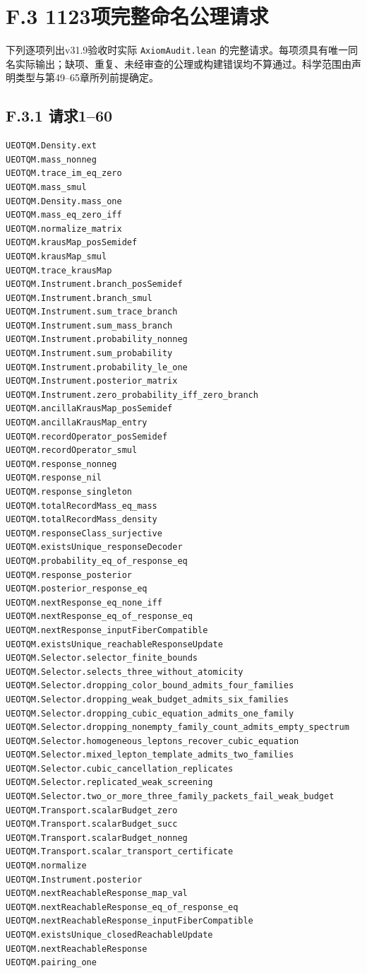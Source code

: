 \documentclass[
  11pt,
  oneside]{book}
\begin{document}
\section{F.3 1123项完整命名公理请求}

下列逐项列出v31.9验收时实际 \texttt{Axiom\allowbreak Audit.\allowbreak lean}
的完整请求。每项须具有唯一同名实际输出；缺项、重复、未经审查的公理或构建错误均不算通过。科学范围由声明类型与第49--65章所列前提确定。

\subsection{F.3.1 请求1--60}

\begin{Verbatim}[breaklines,breakanywhere,fontsize=\scriptsize]
UEOTQM.Density.ext
UEOTQM.mass_nonneg
UEOTQM.trace_im_eq_zero
UEOTQM.mass_smul
UEOTQM.Density.mass_one
UEOTQM.mass_eq_zero_iff
UEOTQM.normalize_matrix
UEOTQM.krausMap_posSemidef
UEOTQM.krausMap_smul
UEOTQM.trace_krausMap
UEOTQM.Instrument.branch_posSemidef
UEOTQM.Instrument.branch_smul
UEOTQM.Instrument.sum_trace_branch
UEOTQM.Instrument.sum_mass_branch
UEOTQM.Instrument.probability_nonneg
UEOTQM.Instrument.sum_probability
UEOTQM.Instrument.probability_le_one
UEOTQM.Instrument.posterior_matrix
UEOTQM.Instrument.zero_probability_iff_zero_branch
UEOTQM.ancillaKrausMap_posSemidef
UEOTQM.ancillaKrausMap_entry
UEOTQM.recordOperator_posSemidef
UEOTQM.recordOperator_smul
UEOTQM.response_nonneg
UEOTQM.response_nil
UEOTQM.response_singleton
UEOTQM.totalRecordMass_eq_mass
UEOTQM.totalRecordMass_density
UEOTQM.responseClass_surjective
UEOTQM.existsUnique_responseDecoder
UEOTQM.probability_eq_of_response_eq
UEOTQM.response_posterior
UEOTQM.posterior_response_eq
UEOTQM.nextResponse_eq_none_iff
UEOTQM.nextResponse_eq_of_response_eq
UEOTQM.nextResponse_inputFiberCompatible
UEOTQM.existsUnique_reachableResponseUpdate
UEOTQM.Selector.selector_finite_bounds
UEOTQM.Selector.selects_three_without_atomicity
UEOTQM.Selector.dropping_color_bound_admits_four_families
UEOTQM.Selector.dropping_weak_budget_admits_six_families
UEOTQM.Selector.dropping_cubic_equation_admits_one_family
UEOTQM.Selector.dropping_nonempty_family_count_admits_empty_spectrum
UEOTQM.Selector.homogeneous_leptons_recover_cubic_equation
UEOTQM.Selector.mixed_lepton_template_admits_two_families
UEOTQM.Selector.cubic_cancellation_replicates
UEOTQM.Selector.replicated_weak_screening
UEOTQM.Selector.two_or_more_three_family_packets_fail_weak_budget
UEOTQM.Transport.scalarBudget_zero
UEOTQM.Transport.scalarBudget_succ
UEOTQM.Transport.scalarBudget_nonneg
UEOTQM.Transport.scalar_transport_certificate
UEOTQM.normalize
UEOTQM.Instrument.posterior
UEOTQM.nextReachableResponse_map_val
UEOTQM.nextReachableResponse_eq_of_response_eq
UEOTQM.nextReachableResponse_inputFiberCompatible
UEOTQM.existsUnique_closedReachableUpdate
UEOTQM.nextReachableResponse
UEOTQM.pairing_one
\end{Verbatim}
\end{document}
